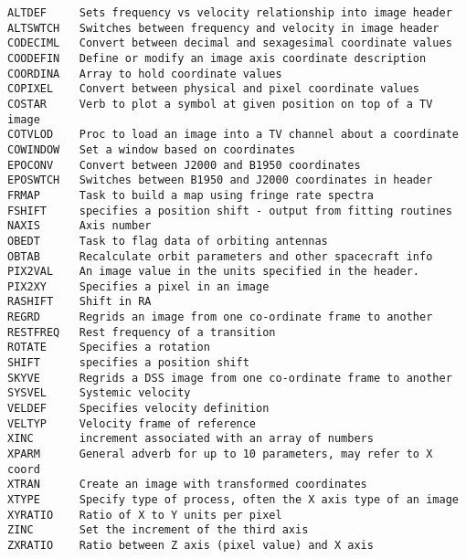 \vskip 0.5pt
\bbve\begin{verbatim}
ALTDEF     Sets frequency vs velocity relationship into image header
ALTSWTCH   Switches between frequency and velocity in image header
CODECIML   Convert between decimal and sexagesimal coordinate values
COODEFIN   Define or modify an image axis coordinate description
COORDINA   Array to hold coordinate values
COPIXEL    Convert between physical and pixel coordinate values
COSTAR     Verb to plot a symbol at given position on top of a TV image
COTVLOD    Proc to load an image into a TV channel about a coordinate
COWINDOW   Set a window based on coordinates
EPOCONV    Convert between J2000 and B1950 coordinates
EPOSWTCH   Switches between B1950 and J2000 coordinates in header
FRMAP      Task to build a map using fringe rate spectra
FSHIFT     specifies a position shift - output from fitting routines
NAXIS      Axis number
OBEDT      Task to flag data of orbiting antennas
OBTAB      Recalculate orbit parameters and other spacecraft info
PIX2VAL    An image value in the units specified in the header.
PIX2XY     Specifies a pixel in an image
RASHIFT    Shift in RA
REGRD      Regrids an image from one co-ordinate frame to another
RESTFREQ   Rest frequency of a transition
ROTATE     Specifies a rotation
SHIFT      specifies a position shift
SKYVE      Regrids a DSS image from one co-ordinate frame to another
SYSVEL     Systemic velocity
VELDEF     Specifies velocity definition
VELTYP     Velocity frame of reference
XINC       increment associated with an array of numbers
XPARM      General adverb for up to 10 parameters, may refer to X coord
XTRAN      Create an image with transformed coordinates
XTYPE      Specify type of process, often the X axis type of an image
XYRATIO    Ratio of X to Y units per pixel
ZINC       Set the increment of the third axis
ZXRATIO    Ratio between Z axis (pixel value) and X axis
\end{verbatim}\eve


